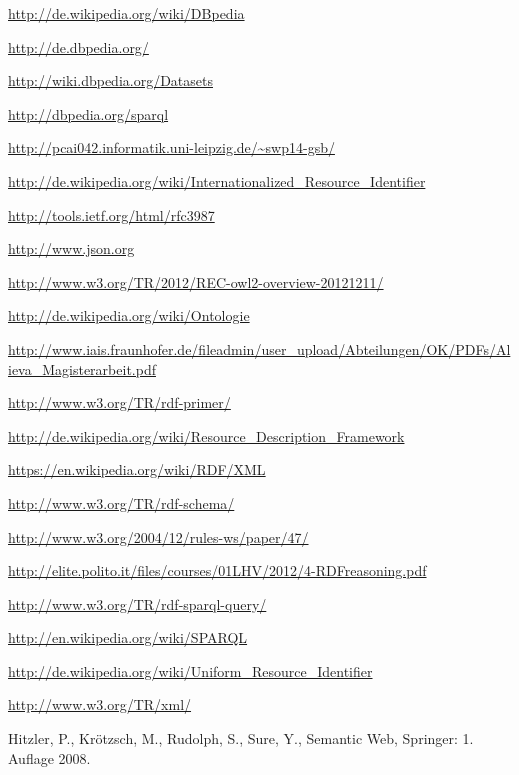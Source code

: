 \begin{thebibliography}{99}

\url{http://de.wikipedia.org/wiki/DBpedia}

\url{http://de.dbpedia.org/}

\url{http://wiki.dbpedia.org/Datasets}

\url{http://dbpedia.org/sparql}

\url{http://pcai042.informatik.uni-leipzig.de/~swp14-gsb/}

\url{http://de.wikipedia.org/wiki/Internationalized_Resource_Identifier}

\url{http://tools.ietf.org/html/rfc3987}

\url{http://www.json.org}

\url{http://www.w3.org/TR/2012/REC-owl2-overview-20121211/}

\url{http://de.wikipedia.org/wiki/Ontologie}

\url{http://www.iais.fraunhofer.de/fileadmin/user_upload/Abteilungen/OK/PDFs/Alieva_Magisterarbeit.pdf}

\url{http://www.w3.org/TR/rdf-primer/}

\url{http://de.wikipedia.org/wiki/Resource_Description_Framework}

\url{https://en.wikipedia.org/wiki/RDF/XML}

\url{http://www.w3.org/TR/rdf-schema/}

\url{http://www.w3.org/2004/12/rules-ws/paper/47/}

\url{http://elite.polito.it/files/courses/01LHV/2012/4-RDFreasoning.pdf}


\url{http://www.w3.org/TR/rdf-sparql-query/}

\url{http://en.wikipedia.org/wiki/SPARQL}

\url{http://de.wikipedia.org/wiki/Uniform_Resource_Identifier}



\url{http://www.w3.org/TR/xml/}

Hitzler, P., Krötzsch, M., Rudolph, S., Sure, Y., Semantic Web, Springer: 1. Auflage 2008.


\end{thebibliography}
